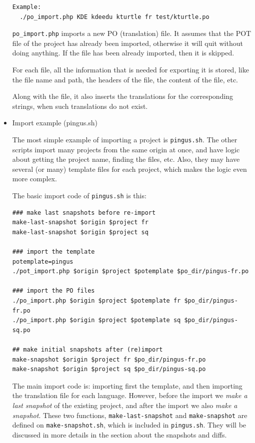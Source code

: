 \documentclass[11pt]{article}
\begin{document}
\begin{itemize}
\begin{verbatim}
Example:
  ./po_import.php KDE kdeedu kturtle fr test/kturtle.po
\end{verbatim}



     \texttt{po\_import.php} imports a new PO (translation) file.  It assumes
     that the POT file of the project has already been imported,
     otherwise it will quit without doing anything.  If the file has
     been already imported, then it is skipped.
       
     For each file, all the information that is needed for exporting it
     is stored, like the file name and path, the headers of the file,
     the content of the file, etc.
       
     Along with the file, it also inserts the translations for the
     corresponding strings, when such translations do not exist.



\item Import example (pingus.sh)\\
\label{sec-8.4.2.3}


     The most simple example of importing a project is \texttt{pingus.sh}. The
     other scripts import many projects from the same origin at once,
     and have logic about getting the project name, finding the files,
     etc. Also, they may have several (or many) template files for each
     project, which makes the logic even more complex.

     The basic import code of \texttt{pingus.sh} is this:

\begin{verbatim}
### make last snapshots before re-import
make-last-snapshot $origin $project fr
make-last-snapshot $origin $project sq

### import the template
potemplate=pingus
./pot_import.php $origin $project $potemplate $po_dir/pingus-fr.po

### import the PO files
./po_import.php $origin $project $potemplate fr $po_dir/pingus-fr.po
./po_import.php $origin $project $potemplate sq $po_dir/pingus-sq.po

## make initial snapshots after (re)import
make-snapshot $origin $project fr $po_dir/pingus-fr.po
make-snapshot $origin $project sq $po_dir/pingus-sq.po
\end{verbatim}



     The main import code is: importing first the template, and then
     importing the translation file for each language. However, before
     the import we \emph{make a last snapshot} of the existing project, and
     after the import we also \emph{make a snapshot}. These two functions,
     \texttt{make-last-snapshot} and \texttt{make-snapshot} are defined on
     \texttt{make-snapshot.sh}, which is included in \texttt{pingus.sh}. They will be
     discussed in more details in the section about the snapshots and
     diffs.




\end{itemize}
\end{document}
